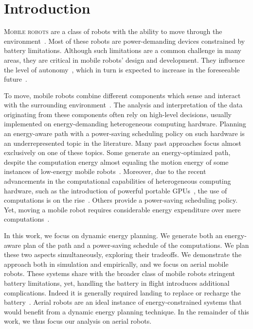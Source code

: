 
\chapter{Introduction}
\label{cp:intro}


\lettrine{M}{obile robots} are a class of robots with the ability to move through the environment~\citep{corke2017robotics}. Most of these robots are power-demanding devices constrained by battery limitations. Although such limitations are a common challenge in many areas, they are critical in mobile robots' design and development. They influence the level of autonomy~\citep{seewald2020mechanical}, which in turn is expected to increase in the foreseeable future~\citep{fisher2013verifying}.

To move, mobile robots combine different components which sense and interact with the surrounding environment~\citep{mei2006deployment}. The analysis and interpretation of the data originating from these components often rely on high-level decisions, usually implemented on energy-demanding heterogeneous computing hardware. Planning an energy-aware path with a power-saving scheduling policy on such hardware is an underrepresented topic in the literature. Many past approaches focus almost exclusively on one of these topics. Some generate an energy-optimized path, despite the computation energy almost equaling the motion energy of some instances of low-energy mobile robots~\citep{sudhakar2020balancing}. Moreover, due to the recent advancements in the computational capabilities of heterogeneous computing hardware, such as the introduction of powerful portable GPUs~\citep{rizvi2017general}, the use of computations is on the rise~\citep{abramov2012real,satria2016real,jaramillo2019visual}. Others provide a power-saving scheduling policy. Yet, moving a mobile robot requires considerable energy expenditure over mere computations~\citep{mei2004energy,mei2005case}.

In this work, we focus on dynamic energy planning. We generate both an energy-aware plan of the path and a power-saving schedule of the computations. We plan these two aspects simultaneously, exploring their tradeoffs. We demonstrate the approach both in simulation and empirically, and we focus on aerial mobile robots. These systems share with the broader class of mobile robots stringent battery limitations, yet, handling the battery in flight introduces additional complications. Indeed it is generally required landing to replace or recharge the battery~\citep{zamanakos2020energy}. Aerial robots are an ideal instance of energy-constrained systems that would benefit from a dynamic energy planning technique. In the remainder of this work, we thus focus our analysis on aerial robots.

